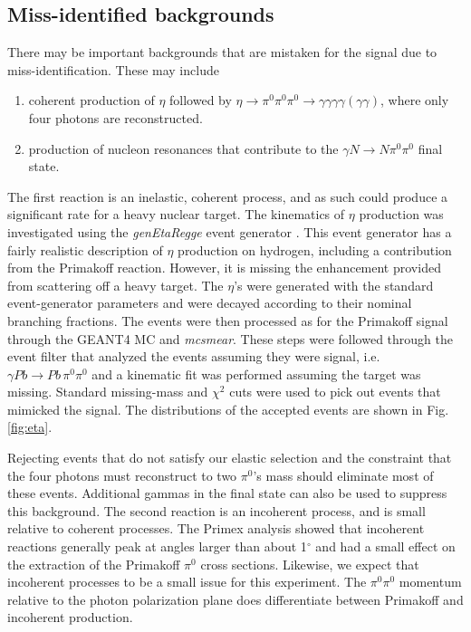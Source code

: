 \subsection{Miss-identified backgrounds}
There may be important backgrounds that are mistaken for the signal due to miss-identification. These may include
\begin{enumerate}[label=(\roman*)]
    \item coherent production of $\eta$ followed by $\eta\rightarrow \pi^0\pi^0\pi^0 \rightarrow \gamma\gamma\gamma\gamma(\gamma\gamma)$, where only four photons are reconstructed.
    \item production of nucleon resonances that contribute to the $\gamma N \rightarrow N \pi^0\pi^0$ final state.
\end{enumerate}
The first reaction is an inelastic, coherent process, and as such
could produce a significant rate for a heavy nuclear target. The kinematics of $\eta$ production was investigated using the {\em genEtaRegge} event generator \cite{hdnote2437}. This event generator has a fairly realistic description of $\eta$ production on hydrogen, including a contribution from the Primakoff reaction. However, it is missing the enhancement provided from scattering off a heavy target. The $\eta$'s were generated with the standard event-generator parameters and were decayed according to their nominal branching fractions. The events were then processed as for the Primakoff signal through the GEANT4 MC and {\em mcsmear}. These steps were followed through the event filter that analyzed the events assuming they were signal, i.e.  $\gamma Pb \rightarrow Pb\, \pi^0 \pi^0$ and a kinematic fit was performed assuming the target was missing. Standard missing-mass and $\chi^2$ cuts were used to pick out events that mimicked the signal. The distributions of the accepted events are shown in Fig.\ref{fig:eta}. 



Rejecting 
events that do not satisfy our elastic selection and the constraint that the four photons must reconstruct to two $\pi^0$'s mass should eliminate most of these events. 
Additional gammas in the final state can also be used to suppress this
background.  
The second reaction is an incoherent process, and is
small relative to coherent processes.  The Primex analysis showed that
incoherent reactions generally peak at angles larger than about 1$^\circ$ and had a small effect on the extraction of the
Primakoff $\pi^0$ cross sections. Likewise, we expect that incoherent processes to be a small issue for this experiment. The $\pi^0\pi^0$ momentum relative to the photon polarization plane does differentiate between Primakoff and incoherent production.

